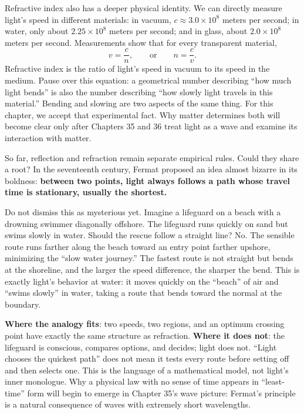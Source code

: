 Refractive index also has a deeper physical identity. We can directly measure light's speed in different materials: in vacuum, \(c\approx 3.0\times10^8\) meters per second; in water, only about \(2.25\times10^8\) meters per second; and in glass, about \(2.0\times10^8\) meters per second. Measurements show that for every transparent material,
\[
v=\frac{c}{n},\qquad\text{or}\qquad n=\frac{c}{v}.
\]
Refractive index is the ratio of light's speed in vacuum to its speed in the medium. Pause over this equation: a geometrical number describing ``how much light bends'' is also the number describing ``how slowly light travels in this material.'' Bending and slowing are two aspects of the same thing. For this chapter, we accept that experimental fact. Why matter determines both will become clear only after Chapters 35 and 36 treat light as a wave and examine its interaction with matter.

So far, reflection and refraction remain separate empirical rules. Could they share a root? In the seventeenth century, Fermat proposed an idea almost bizarre in its boldness: \textbf{between two points, light always follows a path whose travel time is stationary, usually the shortest.}

Do not dismiss this as mysterious yet. Imagine a lifeguard on a beach with a drowning swimmer diagonally offshore. The lifeguard runs quickly on sand but swims slowly in water. Should the rescue follow a straight line? No. The sensible route runs farther along the beach toward an entry point farther upshore, minimizing the ``slow water journey.'' The fastest route is not straight but bends at the shoreline, and the larger the speed difference, the sharper the bend. This is exactly light's behavior at water: it moves quickly on the ``beach'' of air and ``swims slowly'' in water, taking a route that bends toward the normal at the boundary.

\textbf{Where the analogy fits}: two speeds, two regions, and an optimum crossing point have exactly the same structure as refraction. \textbf{Where it does not}: the lifeguard is conscious, compares options, and decides; light does not. ``Light chooses the quickest path'' does not mean it tests every route before setting off and then selects one. This is the language of a mathematical model, not light's inner monologue. Why a physical law with no sense of time appears in ``least-time'' form will begin to emerge in Chapter 35's wave picture: Fermat's principle is a natural consequence of waves with extremely short wavelengths.

